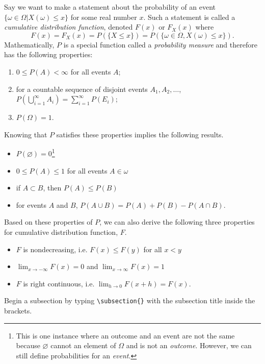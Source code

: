 \documentclass[12pt, notitlepage]{article}
\begin{document}
Say we want to make a statement about the probability of an event $\{\omega \in \Omega | X(\omega) \leq x \}$ for some real number $x$. Such a statement is called a \textit{cumulative distribution function}, denoted $F(x)$ or $F_X(x)$ where 
        $$F(x) = F_X(x) = P(\{X \leq x\}) = P( \{ \omega \in \Omega, X(\omega) \leq x \}).$$ 
Mathematically, $P$ is a special function called a \textit{probability measure} and therefore has the following properties:
        \begin{enumerate}
        \item $0 \leq P(A) < \infty$ for all events $A$;
        \item for a countable sequence of disjoint events $A_1, A_2, \ldots$, $P(\bigcup \limits_{i=1}^\infty A_i) = \sum_{i=1}^\infty P(E_i)$;
        \item $P(\Omega) = 1$.
        \end{enumerate}
Knowing that $P$ satisfies these properties implies the following results.
\begin{itemize}
\item $P(\varnothing) = 0$\footnote{This is one instance where an outcome and an event are not the same because $\varnothing$ cannot an element of $\Omega$ and is not an \textit{outcome}. However, we can still define probabilities for an \textit{event}.}
\item $0 \leq P(A) \leq 1$ for all events $A \in \omega$
\item if $A \subset B$, then $P(A) \leq P(B)$ 
\item for events $A$ and $B$, $P(A \cup B) = P(A) + P(B) - P(A \cap B)$. 
\end{itemize}
Based on these properties of $P$, we can also derive the following three properties for cumulative distribution function, $F$.
\begin{itemize}
\item $F$ is nondecreasing, i.e. $F(x) \leq F(y)$ for all $x < y$
\item $\lim_{x \to - \infty}F(x) = 0$ and $\lim_{x \to \infty}F(x) = 1$
\item $F$ is right continuous, i.e. $\lim_{h \to 0} F(x+h) = F(x)$.
\end{itemize}


\begin{notes}
Begin a subsection by typing \verb|\subsection{}| with the subsection title inside the brackets.
\end{notes}
\end{document}
